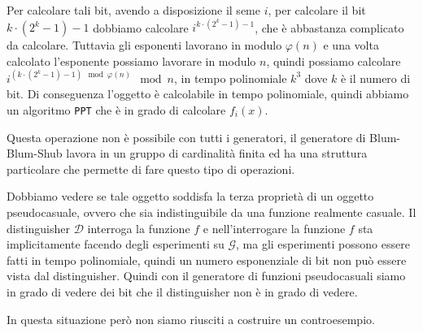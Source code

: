 \begin{figure}[H]
  \centering
\end{figure}

Per calcolare tali bit, avendo a disposizione il seme $i$, per 
calcolare il bit $k \cdot (2^k - 1) - 1$ dobbiamo calcolare
$i^{k \cdot (2^k - 1) - 1}$, che è abbastanza complicato da calcolare.
Tuttavia gli esponenti lavorano in modulo $\varphi(n)$ e una volta 
calcolato l'esponente possiamo lavorare in modulo $n$, quindi
possiamo calcolare $i^{(k \cdot (2^k - 1) - 1)\mod \varphi(n)} \mod n$,
in tempo polinomiale $k^3$ dove $k$ è il numero di bit.
Di conseguenza l'oggetto è calcolabile in tempo polinomiale,
quindi abbiamo un algoritmo \texttt{PPT} che è in grado di calcolare 
$f_i(x)$.

Questa operazione non è possibile con tutti i generatori, il 
generatore di Blum-Blum-Shub lavora in un gruppo di cardinalità 
finita ed ha una struttura particolare che permette di fare
questo tipo di operazioni.

Dobbiamo vedere se tale oggetto soddisfa la terza proprietà di un 
oggetto pseudocasuale, ovvero che sia indistinguibile da una funzione
realmente casuale. Il distinguisher $\mathcal{D}$ interroga 
la funzione $f$ e nell'interrogare la funzione $f$ sta implicitamente 
facendo degli esperimenti su $\mathcal{G}$, ma gli esperimenti possono essere 
fatti in tempo polinomiale, quindi un numero esponenziale di bit non 
può essere vista dal distinguisher. Quindi con il generatore di funzioni 
pseudocasuali siamo in grado di vedere dei bit che il distinguisher non è 
in grado di vedere.

In questa situazione però non siamo riusciti a costruire un controesempio.

